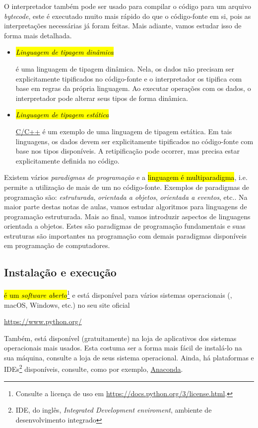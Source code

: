 O interpretador {\python} também pode ser usado para compilar o código para um arquivo \emph{bytecode}, este é executado muito mais rápido do que o código-fonte em si, pois as interpretações necessárias já foram feitas. Mais adiante, vamos estudar isso de forma mais detalhada.

\begin{itemize}
\item \hl{\emph{Linguagem de tipagem dinâmica}}

  {\python} é uma linguagem de tipagem dinâmica. Nela, os dados não precisam ser explicitamente tipificados no código-fonte e o interpretador os tipifica com base em regras da própria linguagem. Ao executar operações com os dados, o interpretador pode alterar seus tipos de forma dinâmica.

\item \hl{\emph{Linguagem de tipagem estática}}

  \href{https://pt.wikipedia.org/wiki/C\%2B\%2B}{C/C++} é um exemplo de uma linguagem de tipagem estática. Em tais linguagens, os dados devem ser explicitamente tipificados no código-fonte com base nos tipos disponíveis. A retipificação pode ocorrer, mas precisa estar explicitamente definida no código.
\end{itemize}

Existem vários \emph{paradigmas de programação} e a \hl{linguagem {\python} é multiparadigma}, i.e. permite a utilização de mais de um no código-fonte. Exemplos de paradigmas de programação são: \emph{estruturada}, \emph{orientada a objetos}, \emph{orientada a eventos}, etc.. Na maior parte destas notas de aulas, vamos estudar algoritmos para linguagens de programação estruturada. Mais ao final, vamos introduzir aspectos de linguagens orientada a objetos. Estes são paradigmas de programação fundamentais e suas estruturas são importantes na programação com demais paradigmas disponíveis em programação de computadores.

\subsection{Instalação e execução}

\hl{{\python} é um \emph{software aberto}}\footnote{Consulte a licença de uso em \url{https://docs.python.org/3/license.html}.} e está disponível para vários sistemas operacionais ({\linux}, macOS, Windows, etc.) no seu site oficial
\begin{center}
  \url{https://www.python.org/}
\end{center}
Também, está disponível (gratuitamente) na loja de aplicativos dos sistemas operacionais mais usados. Esta costuma ser a forma mais fácil de instalá-lo na sua máquina, consulte a loja de seus sistema operacional. Ainda, há plataformas e IDEs\footnote{IDE, do inglês, {\it Integrated Development enviroment}, ambiente de desenvolvimento integrado} {\python} disponíveis, consulte, como por exemplo, \href{https://www.anaconda.com/}{Anaconda}.

